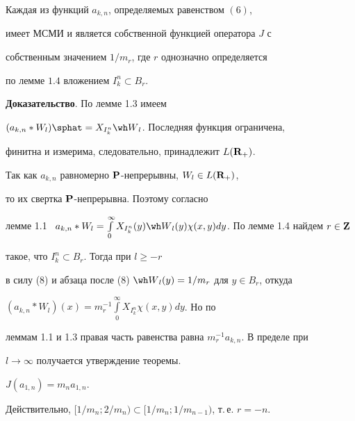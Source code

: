 \begin{thms}


Каждая из функций $a_{k,n}$, определяемых равенством $(6)$, 


имеет МСМИ и является собственной функцией оператора $J$ с 


собственным значением $1/m_r$, где $r$ однозначно определяется 


по лемме $1.4$ вложением $I^n_k\subset B_r$.


\end{thms}








{\bf Доказательство}. По лемме 1.3 имеем


$(a_{k,n}*W_l){\sphat}=X_{I^n_k}{\wh W}_l$. Последняя функция ограничена, 


финитна и измерима, следовательно, принадлежит $L({\bold R}_+)$. 


Так как $a_{k,n}$ равномерно ${\bold P}$-непрерывны, $W_l\in L({\bold R}_+)$, 


то их свертка ${\bold P}$-непрерывна. Поэтому согласно


лемме 1.1 \ $a_{k,n}*W_l=\int\limits^{\infty}_0


X_{I^n_k}(y){\wh W}_l(y)\chi(x,y)dy$. По лемме 1.4 найдем $r\in {\bold Z}$ 


такое, что $I^n_k\subset B_r$. Тогда при $l\geq -r$ 


в силу (8) и абзаца после (8) ${\wh W}_l(y)=1/m_r$ для $y\in B_r$, откуда 


$(a_{k,n}*W_l)(x)=m_r^{-1}\int\limits^{\infty}_0X_{I^n_k}\chi(x,y)dy$. Но по 


леммам 1.1 и 1.3 правая часть равенства равна $m_r^{-1}a_{k,n}$. В пределе при 


$l\to\infty$ получается утверждение теоремы. 








\begin{cors}


$J(a_{1,n})=m_na_{1,n}$.


\end{cors}





Действительно, $[1/m_n;2/m_n)\subset [1/m_n;1/m_{n-1})$, т.\,е. $r=-n$. 








